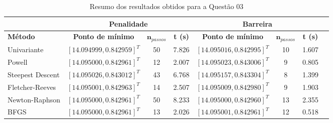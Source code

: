 \documentclass[10pt, a4paper]{article}
\begin{document}
\begin{table}[htpb]
  \centering
  \begin{tabular}{|l|c|c|c|c|c|c|c|}
    \multicolumn{1}{c}{} %
    & 
    \multicolumn{3}{c}{\textbf{Penalidade}} \vline
    & 
    \multicolumn{3}{c}{\textbf{Barreira}} \\%
    \hline%
    \textbf{Método}
    &
    \textbf{Ponto de mínimo}
    & 
    $\mathbf{n}_{passos}$
    & 
    \textbf{t (s)}
    &
    \textbf{Ponto de mínimo}
    & 
    $\mathbf{n}_{passos}$
    & 
    \textbf{t (s)}
    \\
    Univariante        & $[14.094999, 0.842959]^T$ & 50 & 7.826 &  $[14.095016, 0.842995]^T$ &  10  & 1.607    \\
    Powell             & $[14.095000, 0.842961]^T$ & 12 & 2.007 &  $[14.095023, 0.843006]^T$ &   9  & 0.805    \\
    Steepest Descent   & $[14.095026, 0.843012]^T$ & 43 & 6.768 &  $[14.095157, 0.843304]^T$ &   8  & 1.399    \\
    Fletcher-Reeves    & $[14.095001, 0.842963]^T$ & 14 & 2.507 &  $[14.095009, 0.842980]^T$ &   9  & 1.903    \\
    Newton-Raphson     & $[14.095000, 0.842961]^T$ & 50 & 8.233 &  $[14.095000, 0.842960]^T$ &  13  & 2.355    \\
    BFGS               & $[14.095000, 0.842961]^T$ & 13 & 2.026 &  $[14.095001, 0.842961]^T$ &  12  & 0.518    \\
    \hline
  \end{tabular}
  \caption{Resumo dos resultados obtidos para a Questão 03}
  \label{tab:q3_results}
\end{table}
\end{document}
